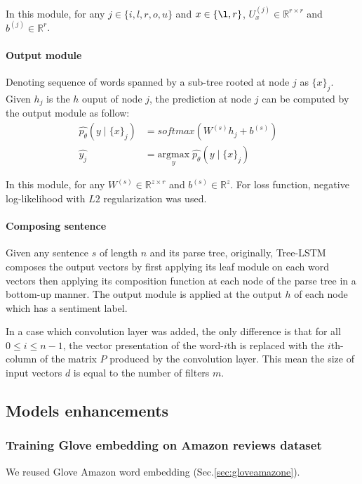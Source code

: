 In this module, for any \(j \in \{i, l, r, o, u\}\) and \(x \in \{\l, r\}\), \(U_x^{(j)} \in \mathbb{R}^{r \times r}\) and \( b^{(j)} \in \mathbb{R}^r\).

\paragraph{Output module} Denoting sequence of words spanned by a sub-tree rooted at node \({j}\) as \({\{x\}_j}\).
Given \({h_j}\) is the \({h}\) ouput of node \({j}\), the prediction at node \({j}\) can be computed by the output module as follow:
\begin{align}
      \hat{p_{\theta}}(y \mid \{x\}_j ) &= softmax( W^{(s)} h_j + b^{(s)}) & \\
      \hat{y_j} &= \underset{y}{\mathrm{argmax}} \; \hat{p_{\theta}}(y \mid \{x\}_j ) &
\end{align}

In this module, for any \(W^{(s)} \in \mathbb{R}^{z \times r}\) and \( b^{(s)} \in \mathbb{R}^z\).
For loss function, negative log-likelihood with \(L2\) regularization was used.

\paragraph{Composing sentence}
Given any sentence \({s}\) of length \({n}\) and its parse tree, originally, Tree-LSTM composes the output vectors by first applying its leaf module on each word vectors then applying its composition function at each node of the parse tree in a bottom-up manner.
The output module is applied at the output \({h}\) of each node which has a sentiment label.

In a case which convolution layer was added, the only difference is that for all \(0 \leq i \leq n-1\), the vector presentation of the word-\({i}\)th is replaced with the \({i}\)th-column of the matrix \({P}\) produced by the convolution layer.
This mean the size of input vectors \(d\) is equal to the number of filters \(m\).

\subsection{Models enhancements}\label{sec:model-enhan}
\subsubsection{Training Glove embedding on Amazon reviews dataset}\label{sec:reuse-glove-amazon}
We reused Glove Amazon word embedding (Sec.\ref{sec:gloveamazone}).

